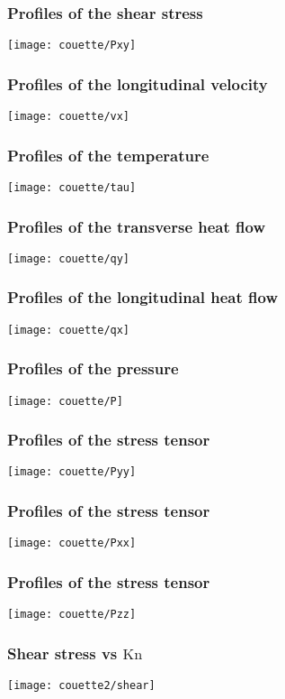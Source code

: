 \documentclass[mathserif]{beamer} %
\newcommand{\Kn}{\mathrm{Kn}}
\begin{document}
\begin{frame}
    \frametitle{Profiles of the shear stress}
    \centering
    \texttt{[image: couette/Pxy]}
\end{frame}

\begin{frame}
    \frametitle{Profiles of the longitudinal velocity}
    \centering
    \texttt{[image: couette/vx]}
\end{frame}

\begin{frame}
    \frametitle{Profiles of the temperature}
    \centering
    \texttt{[image: couette/tau]}
\end{frame}

\begin{frame}
    \frametitle{Profiles of the transverse heat flow}
    \centering
    \texttt{[image: couette/qy]}
\end{frame}

\begin{frame}
    \frametitle{Profiles of the longitudinal heat flow}
    \centering
    \texttt{[image: couette/qx]}
\end{frame}

\begin{frame}
    \frametitle{Profiles of the pressure}
    \centering
    \texttt{[image: couette/P]}
\end{frame}

\begin{frame}
    \frametitle{Profiles of the stress tensor}
    \centering
    \texttt{[image: couette/Pyy]}
\end{frame}

\begin{frame}
    \frametitle{Profiles of the stress tensor}
    \centering
    \texttt{[image: couette/Pxx]}
\end{frame}

\begin{frame}
    \frametitle{Profiles of the stress tensor}
    \centering
    \texttt{[image: couette/Pzz]}
\end{frame}


\begin{frame}
    \frametitle{Shear stress vs \(\Kn\)}
    \vspace{-2pt}
    \centering\hspace{-1.5cm}
    \texttt{[image: couette2/shear]}
    \hspace{-1.5cm}
\end{frame}
\end{document}
